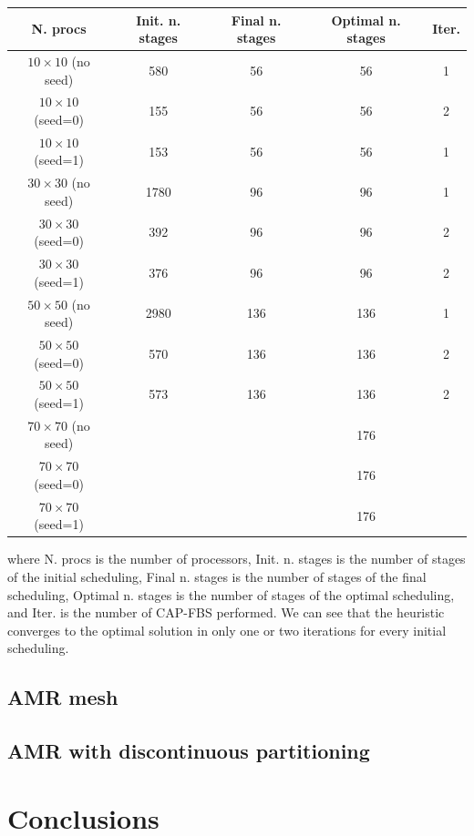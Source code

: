 \documentclass[letterpaper]{article}
\renewcommand{\(}{\left(}
\renewcommand{\)}{\right)}
\renewcommand{\[}{\left[}
\renewcommand{\]}{\right]}
\begin{document}
\begin{table}[H]
  \begin{center}
    \begin{tabular}{|c|c|c|c|c|}
      \hline
      N. procs & Init. n. stages & Final n. stages & Optimal n. stages & Iter. \\
      \hline
      $10\times 10$ (no seed) &  580 &  56 &  56 & 1 \\
      $10\times 10$ (seed=0)  &  155 &  56 &  56 & 2 \\
      $10\times 10$ (seed=1)  &  153 &  56 &  56 & 1 \\
      $30\times 30$ (no seed) & 1780 &  96 &  96 & 1 \\
      $30\times 30$ (seed=0)  &  392 &  96 &  96 & 2 \\
      $30\times 30$ (seed=1)  &  376 &  96 &  96 & 2 \\
      $50\times 50$ (no seed) & 2980 & 136 & 136 & 1 \\
      $50\times 50$ (seed=0)  &  570 & 136 & 136 & 2 \\ %
      $50\times 50$ (seed=1)  &  573 & 136 & 136 & 2 \\
      $70\times 70$ (no seed) & & & 176 & \\
      $70\times 70$ (seed=0)  & & & 176 & \\
      $70\times 70$ (seed=1)  & & & 176 & \\
      \hline
    \end{tabular}
  \end{center}
\end{table}
where N. procs is the number of processors, Init. n. stages is the number of
stages of the initial scheduling, Final n. stages is the number of stages of the
final scheduling, Optimal n. stages is the number of stages of the optimal
scheduling, and Iter. is the number of CAP-FBS performed. We can see that the
heuristic converges to the optimal solution in only one or two iterations for
every initial scheduling.

\subsection{AMR mesh}

\subsection{AMR with discontinuous partitioning}

\section{Conclusions}




\end{document}
